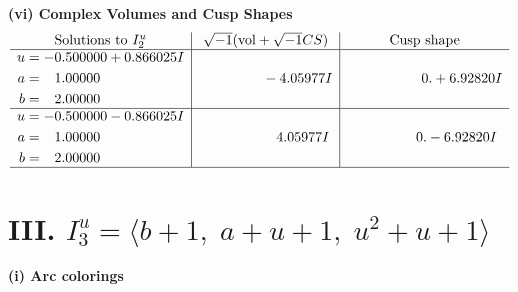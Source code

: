\documentclass[1p]{elsarticle_modified}
\theoremstyle{definition}
\newcommand{\I}{\sqrt{-1}}
\begin{document}
\newpage\flushleft \textbf{(vi) Complex Volumes and Cusp Shapes}
$$\begin{array}{c|c|c}  
\text{Solutions to }I^u_{2}& \I (\text{vol} + \sqrt{-1}CS) & \text{Cusp shape}\\
 \hline 
\begin{aligned}
u &= -0.500000 + 0.866025 I \\
a &= \phantom{-}1.00000\phantom{ +0.000000I} \\
b &= \phantom{-}2.00000\phantom{ +0.000000I}\end{aligned}
 & \phantom{-0.000000 } -4.05977 I & \phantom{-0.000000 -}0. + 6.92820 I \\ \hline\begin{aligned}
u &= -0.500000 - 0.866025 I \\
a &= \phantom{-}1.00000\phantom{ +0.000000I} \\
b &= \phantom{-}2.00000\phantom{ +0.000000I}\end{aligned}
 & \phantom{-0.000000 -}4.05977 I & \phantom{-0.000000 } 0. - 6.92820 I\\
 \hline 
 \end{array}$$\newpage\newpage\renewcommand{\arraystretch}{1}
\centering \section*{III. $I^u_{3}= \langle b+1,\;a+u+1,\;u^2+u+1 \rangle$}
\flushleft \textbf{(i) Arc colorings}\\
\end{document}

